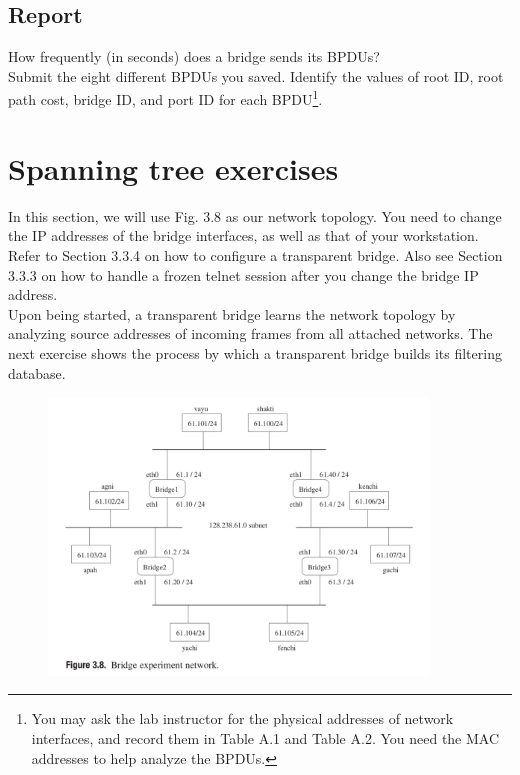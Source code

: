 \documentclass[10pt,a4paper]{article}
\numberwithin{equation}{section}
\numberwithin{figure}{section}
\numberwithin{table}{section}
\begin{document}
    \subsection*{Report}
    How frequently (in seconds) does a bridge sends its BPDUs? \\
    Submit the eight different BPDUs you saved.
    Identify the values of root ID, root path cost, bridge ID, and port ID for each BPDU\footnote{You may ask the lab instructor for the physical addresses of network interfaces, and record them in Table A.1 and Table A.2. You need the MAC addresses to help analyze the BPDUs.}.

    \section*{Spanning tree exercises}
    In this section, we will use Fig. 3.8 as our network topology.
    You need to change the IP addresses of the bridge interfaces, as well as that of your workstation. Refer to Section 3.3.4 on how to configure a transparent bridge.
    Also see Section 3.3.3 on how to handle a frozen telnet session after you change the bridge IP address. \\
    Upon being started, a transparent bridge learns the network topology by analyzing source addresses of incoming frames from all attached networks.
    The next exercise shows the process by which a transparent bridge builds its filtering database.
    \begin{figure}[H]
        \centering
        \includegraphics[width=0.9\textwidth]{img/figure3-8.png}
    \end{figure}
\end{document}
